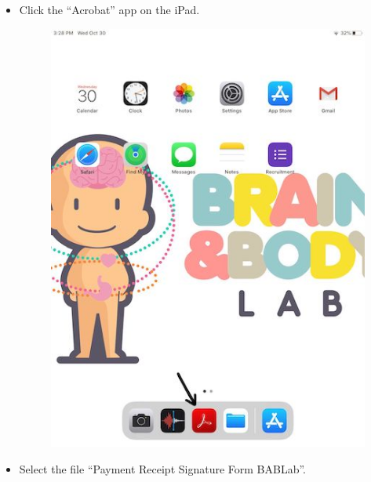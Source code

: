\documentclass[]{book}
\begin{document}
\begin{itemize}
\item
  Click the ``Acrobat'' app on the iPad.

  \begin{figure}
  \centering
  \includegraphics{images/payment/3.jpeg}
  \caption{}
  \end{figure}
\item
  Select the file ``Payment Receipt Signature Form BABLab''.


\end{itemize}
\end{document}
